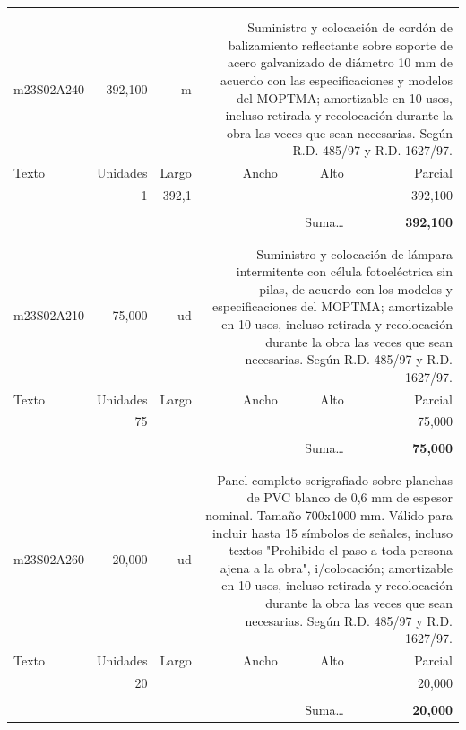 \documentclass{book}%
\begin{document}
\begin{longtable}{lrrrrr}
\hline%
&&&&&\\%
&&&&&\\%
m23S02A240&   392,100& m&\multicolumn{3}{p{6cm}}{\scriptsize Suministro y colocación de cordón de balizamiento reflectante sobre soporte de acero galvanizado de diámetro 10 mm de acuerdo con las especificaciones y modelos del MOPTMA; amortizable en 10 usos, incluso retirada y recolocación durante la obra las veces que sean necesarias. Según R.D. 485/97 y R.D. 1627/97.\normalsize}\\%
Texto&Unidades&Largo&Ancho&Alto&Parcial\\%
\hline%
\multicolumn{1}{p{3.5cm}}{ }&1&392,1&&&   392,100\\%
&&&&&\\%
\multicolumn{5}{r}{Suma\ldots}&\textbf{   392,100}\\%
\hline%
&&&&&\\%
&&&&&\\%
m23S02A210&    75,000& ud&\multicolumn{3}{p{6cm}}{\scriptsize Suministro y colocación de lámpara intermitente con célula fotoeléctrica sin pilas, de acuerdo con los modelos y especificaciones del MOPTMA; amortizable en 10 usos, incluso retirada y recolocación durante la obra las veces que sean necesarias. Según R.D. 485/97 y R.D. 1627/97.\normalsize}\\%
Texto&Unidades&Largo&Ancho&Alto&Parcial\\%
\hline%
\multicolumn{1}{p{3.5cm}}{ }&75&&&&    75,000\\%
&&&&&\\%
\multicolumn{5}{r}{Suma\ldots}&\textbf{    75,000}\\%
\hline%
&&&&&\\%
&&&&&\\%
m23S02A260&    20,000& ud&\multicolumn{3}{p{6cm}}{\scriptsize Panel completo serigrafiado sobre planchas de PVC blanco de 0,6 mm de espesor nominal. Tamaño 700x1000 mm. Válido para incluir hasta 15 símbolos de señales, incluso textos "Prohibido el paso a toda persona ajena a la obra", i/colocación; amortizable en 10 usos, incluso retirada y recolocación durante la obra las veces que sean necesarias. Según R.D. 485/97 y R.D. 1627/97.\normalsize}\\%
Texto&Unidades&Largo&Ancho&Alto&Parcial\\%
\hline%
\multicolumn{1}{p{3.5cm}}{ }&20&&&&    20,000\\%
&&&&&\\%
\multicolumn{5}{r}{Suma\ldots}&\textbf{    20,000}\\%

\end{longtable}
\end{document}
